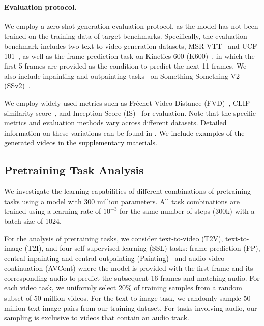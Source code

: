 \paragraph{Evaluation protocol.}
We employ a zero-shot generation evaluation protocol, 
as the model has not been trained on the training data of target benchmarks.
%
Specifically, the evaluation benchmark includes two text-to-video generation datasets, MSR-VTT~\cite{xu2016msr} and UCF-101~\cite{soomro2012ucf101}, as well as the frame prediction task on Kinetics 600 (K600)~\cite{carreira2018short}, in which the first 5 frames are provided as the condition to predict the next 11 frames. We also include inpainting and outpainting tasks~\cite{yu2023magvit} on Something-Something V2 (SSv2)~\cite{goyal2017something}. 

We employ widely used metrics such as Fréchet Video Distance (FVD)~\cite{unterthiner2018towards}, CLIP similarity score~\cite{wu2021godiva}, and Inception Score (IS)~\cite{saito2020train} for evaluation. 
%
Note that the specific metrics and evaluation methods vary across different datasets. Detailed information on these variations can be found in . 
\textcolor{black}{
We include examples of the generated videos in the supplementary materials.}

\vspace{-2mm}
\subsection{Pretraining Task Analysis}
\vspace{-2mm}
We investigate the learning capabilities of different combinations of pretraining tasks using a model with 300 million parameters. 
%
All task combinations are trained using a learning rate of $10^{-3}$ for the same number of steps (300k) with a batch size of 1024.

For the analysis of pretraining tasks, we consider text-to-video (T2V), text-to-image (T2I), and four self-supervised learning (SSL) tasks: frame prediction (FP), central inpainting and central outpainting (Painting)~\cite{yu2023magvit} and audio-video continuation (AVCont) where the model is provided with the first frame and its corresponding audio to predict the subsequent 16 frames and matching audio. 
For each video task, we uniformly select 20\% of training samples from a random subset of 50 million videos.
%
For the text-to-image task, we randomly sample 50 million text-image pairs from our training dataset.
%
For tasks involving audio, our sampling is exclusive to videos that contain an audio track.

